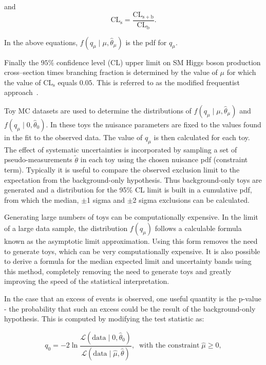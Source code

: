 and 
\begin{equation}
\mathrm{CL_{s}} = \frac{\mathrm{CL_{s+b}}}{\mathrm{CL_{b}}}.
\end{equation}

In the above equations, $f(q_{\mu}\mid\mu,\hat{\theta}_{\mu})$ is the
\ac{pdf} for $q_{\mu}$. 

Finally the $95\%$ confidence level (CL) upper limit on \ac{SM} Higgs boson production
cross--section times branching fraction is determined by the value of $\mu$
for which the value of $\mathrm{CL_{s}}$ equals $0.05$. This is referred to as 
the modified frequentist approach~\cite{Read2}.

Toy \ac{MC} datasets are used to determine the distributions of 
$f(q_{\mu}\mid\mu,\hat{\theta}_{\mu})$ and $f(q_{\mu}\mid0,\hat{\theta}_{0})$.
In these toys the nuisance parameters are
fixed to the values found in the fit to the observed data. The value of
$q_{\mu}$ is then calculated for each toy. The effect of systematic
uncertainties is incorporated by sampling a set of pseudo-measurements
$\tilde{\theta}$ in each toy using the chosen nuisance \ac{pdf} (constraint term).
Typically it is useful to compare the observed exclusion limit to the expectation 
from the background-only hypothesis. Thus background-only toys are generated and
a distribution for the 95\% CL limit is built in a cumulative \ac{pdf}, from
which the median, $\pm$1 sigma and $\pm$2 sigma exclusions can be calculated.

Generating large numbers of toys can be computationally expensive. 
In the limit of a large data sample, the distribution $f(q_{\mu})$ follows a
calculable formula~\cite{Cowan:2011aa} known as the asymptotic limit approximation. Using this form
removes the need to generate toys, which can be very computationally expensive.
It is also possible to derive a formula for
the median expected limit and uncertainty bands using this method, completely
removing the need to generate toys and greatly improving the speed of the
statistical interpretation.

In the case that an excess of events is observed, one useful quantity is the
p-value - the probability that such an excess could be the result of the
background-only hypothesis. This is computed by modifying the test statistic as:

\begin{equation}
q_{0} = -2
\ln\frac{\mathcal{L}(\mathrm{data}\mid0,\hat{\theta}_{0})}{\mathcal{L}(\mathrm{data}\mid\hat{\mu},\hat{\theta})},
\;\; \text{with the constraint} \; \hat{\mu}\geq 0,
\end{equation}

